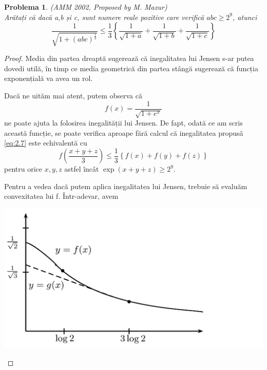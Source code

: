 \documentclass[a4paper,12pt,oneside]{report}
\newtheorem{problem}{Problema}
\begin{document}
\begin{problem}(AMM 2002, Proposed by M. Mazur)\\
Arătați că dacă a,b și c, sunt numere reale pozitive care verifică \(abc \geq 2^{9}\), atunci
\begin{displaymath}
  \frac{1}{\sqrt{1 + \left ( abc \right )^{\frac{1}{3}}}}\leq \frac{1}{3}\left \{ \frac{1}{\sqrt{1 + a}} + \frac{1}{\sqrt{1 + b}} + \frac{1}{\sqrt{1 + c}}\right \}    	
  \label{eq:2.7} \tag{2.7}
\end{displaymath}
\end{problem}
\begin{proof}
Media din partea dreaptă sugerează că inegalitatea lui Jensen s-ar putea dovedi utilă, în timp ce media geometrică din partea stângă sugerează că funcția exponențială va avea un rol.

Dacă ne uităm mai atent, putem observa că
\begin{displaymath}
  f\left ( x \right ) = \frac{1}{\sqrt{1+ e^{x}}}
\end{displaymath}
ne poate ajuta la folosirea inegalității lui Jensen. De fapt, odată ce am scris această funcție, se poate verifica aproape fără calcul că inegalitatea propusă \ref{eq:2.7} este echivalentă cu
\begin{displaymath}
  f\left ( \frac{x + y + z}{3} \right )\leq \frac{1}{3}\left \{ f\left ( x \right ) + f\left ( y \right ) + f\left ( z \right ) \right \}    \label{eq:2.8} \tag{2.8}
\end{displaymath}
pentru orice $x, y, z$ astfel încât \(\exp\left ( x + y + z \right )\geq 2^{9}.\)

Pentru a vedea dacă putem aplica inegalitatea lui Jensen, trebuie să evaluăm convexitatea lui f. Într-adevar, avem

\begin{center}
	\includegraphics[width=1.0\textwidth]{fig_pb3.png}
\end{center}


\end{proof}
\end{document}

